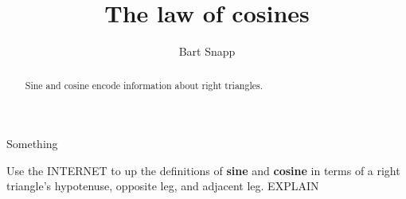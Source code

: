 \documentclass[noauthor,nooutcomes,12pt]{ximera}
\title{The law of cosines}
\author{Bart Snapp}
\begin{document}
\begin{abstract}
  Sine and cosine encode information about right triangles.
\end{abstract}
\maketitle

\begin{listOutcomes}
\item Something
\end{listOutcomes}
\mynewpage




\begin{question}
  Use the INTERNET to up the definitions of \textbf{sine} and
  \textbf{cosine} in terms of a right triangle's hypotenuse, opposite
  leg, and adjacent leg. EXPLAIN
  
  
\end{question}
\mynewpage
\end{document}
